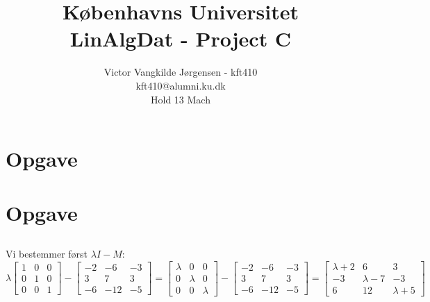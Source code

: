 \documentclass[a4paper,12pt]{article}
\title{Københavns Universitet\\
LinAlgDat - Project C}
\author{Victor Vangkilde Jørgensen - kft410\\ 
kft410@alumni.ku.dk\\
Hold 13 Mach}
\begin{document}
 
 
\maketitle 

\section[Opgave]{Opgave}
\subsection{}


\subsection{}


\subsection{}


\subsection{}


\subsection{}


\section[Opgave]{Opgave}
\subsection{}

Vi bestemmer først $\lambda I - M$:
\[
\lambda
\left[\begin{array}{ccc}
    1 & 0 & 0\\
    0 & 1 & 0 \\
    0 & 0 & 1
\end{array}\right]
-
\left[\begin{array}{ccc}
    -2 & -6 & -3\\
    3 & 7 & 3 \\
    -6 & -12 & -5
\end{array}\right]
=
\left[\begin{array}{ccc}
    \lambda & 0 & 0\\
    0 & \lambda & 0 \\
    0 & 0 & \lambda
\end{array}\right]
-
\left[\begin{array}{ccc}
    -2 & -6 & -3\\
    3 & 7 & 3 \\
    -6 & -12 & -5
\end{array}\right]
=
\left[\begin{array}{ccc}
    \lambda+2 & 6 & 3\\
    -3 & \lambda-7 & -3 \\
    6 & 12 & \lambda+5
\end{array}\right]
\]\\
\end{document}
